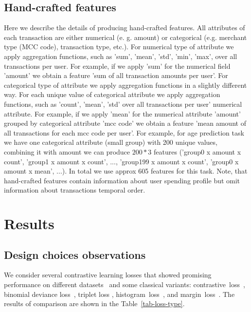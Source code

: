 \documentclass{article}
\begin{document}
\subsection{Hand-crafted features} \label{app-sec-hand}

Here we describe the details of producing hand-crafted features. All attributes of each transaction are either numerical (e. g. amount) or categorical (e.g. merchant type (MCC code), transaction type, etc.). 
For numerical type of attribute we apply aggregation functions, such as 'sum', 'mean', 'std', 'min', 'max', over all transactions per user. For example, if we apply 'sum' for the numerical field 'amount' we obtain a feature 'sum of all transaction amounts per user'. 
For categorical type of attribute we apply aggregation functions in a slightly different way. For each unique value of categorical attribute we apply aggregation functions, such as 'count', 'mean', 'std' over all transactions per user' numerical attribute. For example, if we apply 'mean' for the numerical attribute 'amount' grouped by categorical attribute 'mcc code' we obtain a feature 'mean amount of all transactions for each mcc code per user'. 
For example, for age prediction task we have one categorical attribute (small group) with 200 unique values, combining it with amount we can produce $200 * 3$ features ('group0 x amount x count',  'group1 x amount x count', ..., 'group199 x amount x count', 'group0 x amount x mean', ...). In total we use approx 605 features for this task. %
Note, that hand-crafted features contain information about user spending profile but omit information about transactions temporal order.

\section{Results} \label{app-sec-res}

\subsection{Design choices observations} \label{app-sec-design}

We consider several contrastive learning losses that showed promising performance on different datasets~\citep{Kaya2019DeepML} and some classical variants: contrastive~loss~\citep{Hadsell2006DimensionalityRB}, binomial deviance loss~\citep{Yi2014DeepML}, triplet loss \citep{Hoffer2015DeepML}, histogram~loss~\citep{Ustinova2016LearningDE}, and margin~loss~\citep{Manmatha2017SamplingMI}. The results of comparison are shown in the Table~\ref{tab-loss-type}.
\end{document}
